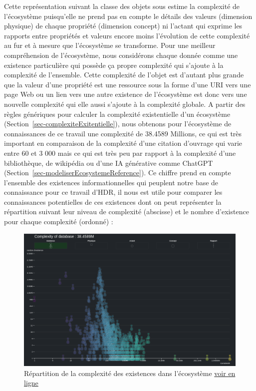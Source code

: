 \documentclass[
  letterpaper,
  DIV=11,
  numbers=noendperiod]{scrreprt}
\begin{document}
Cette représentation suivant la classe des objets sous estime la
complexité de l'écosystème puisqu'elle ne prend pas en compte le détails
des valeurs (dimension physique) de chaque propriété (dimension concept)
ni l'actant qui exprime les rapports entre propriétés et valeurs encore
moins l'évolution de cette complexité au fur et à mesure que
l'écosystème se transforme. Pour une meilleur compréhension de
l'écosystème, nous considérons chaque donnée comme une existence
particulière qui possède ça propre complexité qui s'ajoute à la
complexité de l'ensemble. Cette complexité de l'objet est d'autant plus
grande que la valeur d'une propriété est une ressource sous la forme
d'une URI vers une page Web ou un lien vers une autre existence de
l'écosystème est donc vers une nouvelle complexité qui elle aussi
s'ajoute à la complexité globale. A partir des règles génériques pour
calculer la complexité existentielle d'un écosystème
(Section~\ref{sec-complexiteExitentielle}), nous obtenons pour
l'écosystème de connaissances de ce travail une complexité de 38.4589
Millions, ce qui est très important en comparaison de la complexité
d'une citation d'ouvrage qui varie entre 60 et 3 000 mais ce qui est
très peu par rapport à la complexité d'une bibliothèque, de wikipédia ou
d'une IA générative comme ChatGPT
(Section~\ref{sec-modeliserEcosystemeReference}). Ce chiffre prend en
compte l'ensemble des existences informationnelles qui peuplent notre
base de connaissance pour ce travail d'HDR, il nous est utile pour
comparer les connaissances potentielles de ces existences dont on peut
représenter la répartition suivant leur niveau de complexité (abscisse)
et le nombre d'existence pour chaque complexité (ordonné) :

\begin{figure}

{\centering \includegraphics{images/localhost_samszo_HDR_jdcComplexity.html.png}

}

\caption{\label{fig-RepartitionComplexity}Répartition de la complexité
des existences dans l'écosystème
\href{pulsationsExistentielles.html}{voir en ligne}}

\end{figure}
\end{document}
